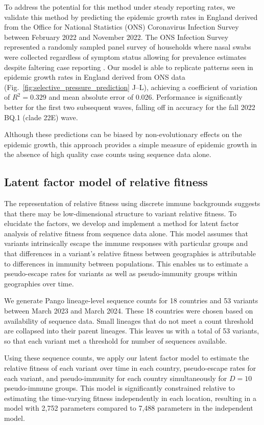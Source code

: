 \documentclass[11pt,oneside,letterpaper]{article}
\begin{document}
To address the potential for this method under steady reporting rates, we validate this method by predicting the epidemic growth rates in England derived from the Office for National Statistics (ONS) Coronavirus Infection Survey between February 2022 and November 2022.
The ONS Infection Survey represented a randomly sampled panel survey of households where nasal swabs were collected regardless of symptom status allowing for prevalence estimates despite faltering case reporting \cite{pouwels2021community}.
Our model is able to replicate patterns seen in epidemic growth rates in England derived from ONS data (Fig.~\ref{fig:selective_pressure_prediction} J--L), achieving a coefficient of variation of $R^2 = 0.329$ and mean absolute error of 0.026.
Performance is significantly better for the first two subsequent waves, falling off in accuracy for the fall 2022 BQ.1 (clade 22E) wave.

Although these predictions can be biased by non-evolutionary effects on the epidemic growth, this approach provides a simple measure of epidemic growth in the absence of high quality case counts using sequence data alone.

\subsection*{Latent factor model of relative fitness}

The representation of relative fitness using discrete immune backgrounds suggests that there may be low-dimensional structure to variant relative fitness.
To elucidate the factors, we develop and implement a method for latent factor analysis of relative fitness from sequence data alone.
This model assumes that variants intrinsically escape the immune responses with particular groups and that differences in a variant's relative fitness between geographies is attributable to differences in immunity between populations.
This enables us to estimate a pseudo-escape rates for variants as well as pseudo-immunity groups within geographies over time.

We generate Pango lineage-level sequence counts for 18 countries and 53 variants between March 2023 and March 2024.
These 18 countries were chosen based on availability of sequence data.
Small lineages that do not meet a count threshold are collapsed into their parent lineages.
This leaves us with a total of 53 variants, so that each variant met a threshold for number of sequences available.

Using these sequence counts, we apply our latent factor model to estimate the relative fitness of each variant over time in each country, pseudo-escape rates for each variant, and pseudo-immunity for each country simultaneously for $D=10$ pseudo-immune groups.
This model is significantly constrained relative to estimating the time-varying fitness independently in each location, resulting in a model with 2,752 parameters compared to 7,488 parameters in the independent model.
\end{document}
